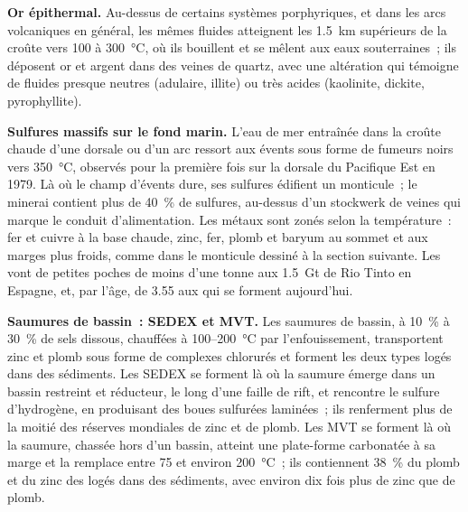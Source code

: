 \textbf{Or épithermal.} Au-dessus de certains systèmes porphyriques, et dans les arcs volcaniques
en général, les mêmes fluides atteignent les \qty{1.5}{km} supérieurs de la croûte
vers 100 à \qty{300}{\celsius}, où ils bouillent et se mêlent aux eaux souterraines~; ils
déposent or et argent dans des veines de quartz, avec une altération qui témoigne de fluides
presque neutres (adulaire, illite) ou très acides (kaolinite, dickite, pyrophyllite).

\textbf{Sulfures massifs sur le fond marin.} L'eau de mer entraînée dans la croûte chaude d'une dorsale ou
d'un arc ressort aux évents sous forme de fumeurs noirs vers \qty{350}{\celsius}, observés pour la première
fois sur la dorsale du Pacifique Est en 1979. Là où le champ d'évents dure, ses sulfures édifient un monticule~;
le minerai contient plus de \qty{40}{\percent} de sulfures, au-dessus d'un stockwerk de veines qui
marque le conduit d'alimentation. Les métaux sont zonés selon la température~: fer et cuivre à la base chaude,
zinc, fer, plomb et baryum au sommet et aux marges plus froids, comme dans le monticule dessiné à la
section suivante. Les  vont de petites poches de moins d'une tonne aux \qty{1.5}{Gt}
de Rio Tinto en Espagne, et, par l'âge, de \qty{3.55}{\Ga} aux  qui se forment aujourd'hui.

\textbf{Saumures de bassin~: SEDEX et MVT.} Les saumures de bassin, à \qty{10}{\percent} à \qty{30}{\percent} de
sels dissous, chauffées à 100--\qty{200}{\celsius} par l'enfouissement, transportent zinc et plomb sous forme de
complexes chlorurés et forment les deux types logés dans des sédiments. Les  SEDEX se forment là où la
saumure émerge dans un bassin restreint et réducteur, le long d'une faille de rift, et rencontre le sulfure d'hydrogène,
en produisant des boues sulfurées laminées~; ils renferment plus de la moitié des réserves mondiales de zinc
et de plomb. Les  MVT se forment là où la saumure, chassée hors d'un bassin, atteint une plate-forme
carbonatée à sa marge et la remplace entre 75 et environ \qty{200}{\celsius}~; ils contiennent \qty{38}{\percent}
du plomb et du zinc des  logés dans des sédiments, avec environ dix fois plus de zinc que de plomb.

